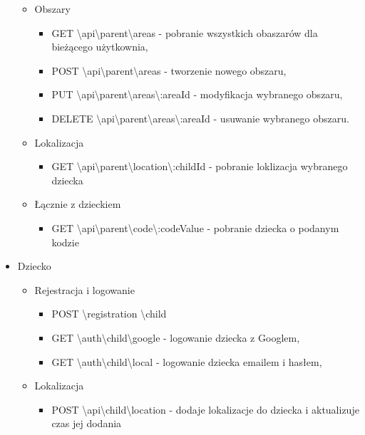 \documentclass{sprawozdanie-agh}
\begin{document}
\begin{itemize}
\begin{itemize}
\begin{itemize}
					\end{itemize}
					\item Obszary
					\begin{itemize}		
						\item GET \textbackslash api\textbackslash parent\textbackslash areas - pobranie wszystkich obaszarów dla bieżącego użytkownia,
						\item POST \textbackslash api\textbackslash parent\textbackslash areas - tworzenie nowego obszaru,
						\item PUT \textbackslash api\textbackslash parent\textbackslash areas\textbackslash :areaId - modyfikacja wybranego obszaru,
						\item DELETE \textbackslash api\textbackslash parent\textbackslash  areas\textbackslash :areaId - usuwanie wybranego obszaru.	
					\end{itemize}
					\item Lokalizacja
					\begin{itemize}
						\item GET \textbackslash api\textbackslash parent\textbackslash location\textbackslash :childId - pobranie loklizacja wybranego dziecka
					\end{itemize}
					\item Łącznie z dzieckiem
					\begin{itemize}
						\item GET \textbackslash api\textbackslash parent\textbackslash code\textbackslash :codeValue - pobranie dziecka o podanym kodzie
					\end{itemize}
				\end{itemize}
				\item Dziecko
				\begin{itemize}
					\item Rejestracja i logowanie
					\begin{itemize}
						\item POST \textbackslash registration \textbackslash child
						\item GET \textbackslash auth\textbackslash child\textbackslash google - logowanie dziecka z Googlem,
						\item GET \textbackslash auth\textbackslash child\textbackslash local - logowanie dziecka emailem i hasłem,	
					\end{itemize}
					\item Lokalizacja
					\begin{itemize}
						\item POST \textbackslash api\textbackslash child\textbackslash location - dodaje lokalizacje do dziecka i aktualizuje czas jej dodania

\end{itemize}
\end{itemize}
\end{itemize}
\end{document}
